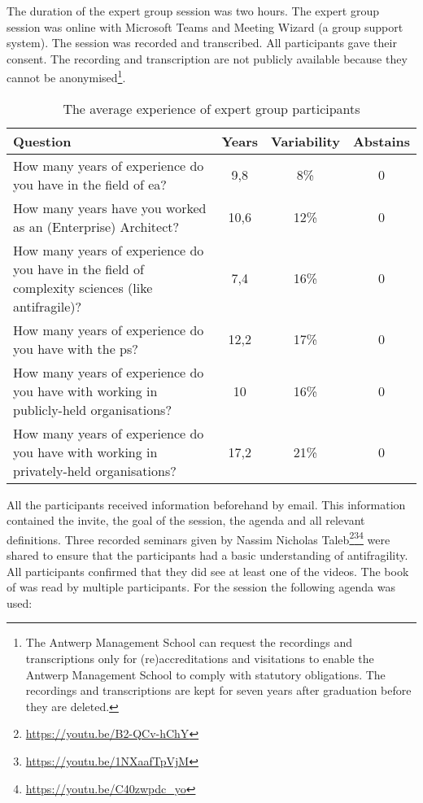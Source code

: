 The duration of the expert group session was two hours. The expert group session was online with Microsoft Teams and Meeting Wizard (a group support system). The session was recorded and transcribed. All participants gave their consent. The recording and transcription are not publicly available because they cannot be anonymised\footnote{The Antwerp Management School can request the recordings and transcriptions only for (re)accreditations and visitations to enable the Antwerp Management School to comply with statutory obligations. The recordings and transcriptions are kept for seven years after graduation before they are deleted.}.
\begin{table}[H]
	\centering
	\begin{tabular}{p{}ccc}
		\toprule
		\textbf{Question} & \textbf{Years} & \textbf{Variability} & \textbf{Abstains} \\
		\midrule
		How many years of experience do you have in the field of \acrlong{ea}? & 9,8 & 8\% & 0 \\%
		How many years have you worked as an (Enterprise) Architect? & 10,6 & 12\% & 0 \\%
		How many years of experience do you have in the field of complexity sciences (like \gls{antifragile})? & 7,4 & 16\% & 0 \\%
		How many years of experience do you have with the \gls{ps}? & 12,2 & 17\% & 0 \\%
		How many years of experience do you have with working in publicly-held organisations? & 10 & 16\% & 0 \\%
		How many years of experience do you have with working in privately-held organisations? & 17,2 & 21\% & 0 \\%
		\bottomrule
	\end{tabular}%
	\caption[The average experience of expert group participants]{The average experience of expert group participants}
	\label{tab:experiencevalidationgroup}%
\end{table}%
All the participants received information beforehand by email. This information contained the invite, the goal of the session, the agenda and all relevant definitions. Three recorded seminars given by Nassim Nicholas Taleb\footnote{\url{https://youtu.be/B2-QCv-hChY}}\footnote{\url{https://youtu.be/1NXaafTpVjM}}\footnote{\url{https://youtu.be/C40zwpdc_yo}} were shared to ensure that the participants had a basic understanding of \gls{antifragility}. All participants confirmed that they did see at least one of the videos. The book of \textcite{Taleb2012} was read by multiple participants. For the session the following agenda was used:
